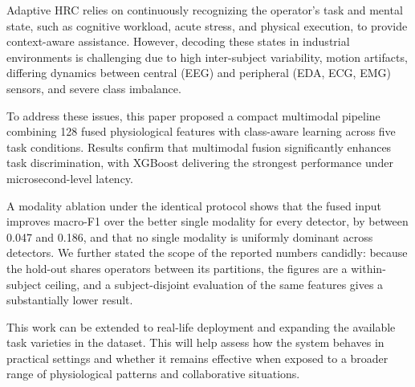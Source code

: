 \documentclass[a4paper,twoside]{article}
\begin{document}
\noindent Adaptive \ac{HRC} relies on continuously recognizing the operator's task and mental state, such as cognitive workload, acute stress, and physical execution, to provide context-aware assistance. However, decoding these states in industrial environments is challenging due to high inter-subject variability, motion artifacts, differing dynamics between central (\ac{EEG}) and peripheral (\ac{EDA}, \ac{ECG}, \ac{EMG}) sensors, and severe class imbalance. 

To address these issues, this paper proposed a compact multimodal pipeline combining 128 fused physiological features with class-aware learning across five task conditions. Results confirm that multimodal fusion significantly enhances task discrimination, with \ac{XGBoost} delivering the strongest performance under microsecond-level latency.

A modality ablation under the identical protocol shows that the fused input improves macro-F1 over the better single modality for every detector, by between 0.047 and 0.186, and that no single modality is uniformly dominant across detectors. We further stated the scope of the reported numbers candidly: because the hold-out shares operators between its partitions, the figures are a within-subject ceiling, and a subject-disjoint evaluation of the same features gives a substantially lower result.

This work can be extended to real-life deployment and expanding the available task varieties in the dataset. This will help assess how the system behaves in practical settings and whether it remains effective when exposed to a broader range of physiological patterns and collaborative situations.

{\small
    }
\end{document}

